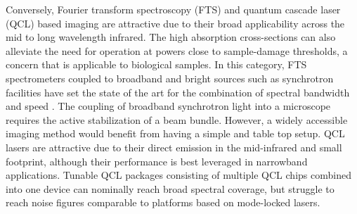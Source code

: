 \documentclass{optica-article}
\begin{document}
Conversely, Fourier transform spectroscopy (FTS) and quantum cascade laser (QCL) based imaging are attractive due to their broad applicability across the mid to long wavelength infrared. The high absorption cross-sections can also alleviate the need for operation at powers close to sample-damage thresholds, a concern that is applicable to biological samples. In this category, FTS spectrometers coupled to broadband and bright sources such as synchrotron facilities have set the state of the art for the combination of spectral bandwidth and speed \cite{nasse_high-resolution_2011}. The coupling of broadband synchrotron light into a microscope requires the active stabilization of a beam bundle. However, a widely accessible imaging method would benefit from having a simple and table top setup. QCL lasers are attractive due to their direct emission in the mid-infrared and small footprint, although their performance is best leveraged in narrowband applications. Tunable QCL packages consisting of multiple QCL chips combined into one device \cite{yeh_fast_2015} can nominally reach broad spectral coverage, but struggle to reach noise figures comparable to platforms based on mode-locked lasers.



\end{document}
